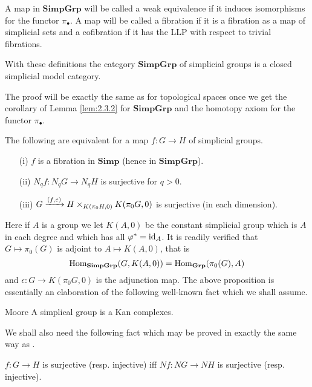 \documentclass[../main]{subfiles}
\begin{document}
A map in \(\mathbf{Simp Grp}\) will be called a weak equivalence if it induces isomorphisms for the functor $\pi_{\bullet}$. A map will be called a fibration if it is a fibration as a map of simplicial sets and a cofibration if it has the LLP with respect to trivial fibrations.

\begin{theorem}
\label{thm:2.3.2}
With these definitions the category \(\mathbf{Simp Grp}\) of simplicial groups is a closed simplicial model category.

The proof will be exactly the same as for topological spaces once we get the corollary of Lemma \ref{lem:2.3.2} for \(\mathbf{Simp Grp}\) and the homotopy axiom for the functor $\pi_{\bullet}$.
\end{theorem}

\begin{proposition}
\label{prop:2.3.1}
The following are equivalent for a map $f : G \longrightarrow H$ of simplicial groups.
\begin{enumerate}
    \item[(i)] $f$ is a fibration in $\mathbf{Simp}$ (hence in \(\mathbf{Simp Grp}\)).
    \item[(ii)] $N_{q}f : N_{q}G \longrightarrow N_{q}H$ is surjective for $q > 0$.
    \item[(iii)] $G\varrightarrow{(f, \varepsilon)}H\times_{K(\pi_{0}H, 0)}K(\pi_{0}G, 0)$ is surjective (in each dimension).
\end{enumerate}
\end{proposition}

Here if $A$ is a group we let $K(A, 0)$ be the constant simplicial group which is $A$ in each degree and which has all $\varphi^{\ast}=\operatorname{id}_{A}$. It is readily verified that $G \mapsto \pi_{0}(G)$ is adjoint to $A \mapsto K(A, 0)$, that is
    \[\operatorname{Hom}_{\mathbf{Simp Grp}}(G, K(A, 0)) = \operatorname{Hom}_{\mathbf{Grp}}(\pi_{0}(G), A)\]
and $\epsilon : G \longrightarrow K(\pi_{0}G, 0)$ is the adjunction map. The above proposition is essentially an elaboration of the following well-known fact which we shall assume.

\begin{customcor}{Moore}\label{Moore}
A simplical group is a Kan complexes.
\end{customcor}

We shall also need the following fact which may be proved in exactly the same way as \cite{dold_homologie_1961}.

\begin{lemma}
\label{lem:2.3.5}
$f : G \longrightarrow H$ is surjective (resp. injective) iff $Nf : NG \longrightarrow NH$ is surjective (resp. injective).
\end{lemma}
\end{document}
